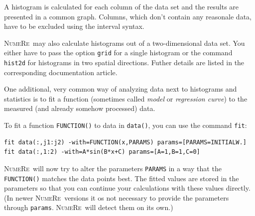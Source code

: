\documentclass[DIV=14,headsepline,footsepline]{scrbook}
\newcommand{\NR}{\textsc{Nu\-me\-Re}}
\begin{document}
				A histogram is calculated for each column of the data set and the results are presented in a common graph. Columns, which don't contain any reasonale data, have to be excluded using the interval syntax.
				
				\NR\ may also calculate histograms out of a two-dimensional data set. You either have to pass the option \verb+grid+ for a single histogram or the command \verb+hist2d+ for histograms in two spatial directions. Futher details are listed in the corresponding documentation article.
				
				One additional, very common way of analyzing data next to histograms and statistics is to fit a function (sometimes called \emph{model} or \emph{regression curve}) to the measured (and already somehow processed) data.
				
				To fit a function \verb+FUNCTION()+ to data in \verb+data()+, you can use the command \verb+fit+:
				\begin{lstlisting}
fit data(:,j1:j2) -with=FUNCTION(x,PARAMS) params=[PARAMS=INITIALW.]
fit data(:,1:2) -with=A*sin(B*x+C) params=[A=1,B=1,C=0]
				\end{lstlisting}
				\NR\ will now try to alter the parameters \verb+PARAMS+ in a way that the \verb+FUNCTION()+ matches the data points best. The fitted values are stored in the parameters so that you can continue your calculations with these values directly. (In newer \NR\ versions it os not necessary to provide the parameters through \verb+params+. \NR\ will detect them on its own.)
				
\end{document}
